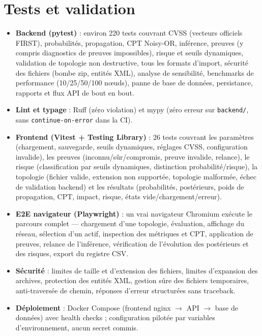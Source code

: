 \documentclass[12pt,a4paper]{article}
\newcommand{\forcereset}[1]{%
    \needspace{#1\baselineskip}%
}
\begin{document}
\newpage

\section{Tests et validation}
\forcereset{6}

\begin{itemize}[leftmargin=1.2cm, itemsep=0.2\baselineskip]
    \item \textbf{Backend (pytest)} : environ 220 tests couvrant CVSS (vecteurs officiels FIRST), probabilités, propagation, CPT Noisy-OR, inférence, preuves (y compris diagnostics de preuves impossibles), risque et seuils dynamiques, validation de topologie non destructive, tous les formats d'import, sécurité des fichiers (bombe zip, entités XML), analyse de sensibilité, benchmarks de performance (10/25/50/100 nœuds), panne de base de données, persistance, rapports et flux API de bout en bout.
    \item \textbf{Lint et typage} : Ruff (zéro violation) et mypy (zéro erreur sur \texttt{backend/}, sans \texttt{continue-on-error} dans la CI).
    \item \textbf{Frontend (Vitest + Testing Library)} : 26 tests couvrant les paramètres (chargement, sauvegarde, seuils dynamiques, réglages CVSS, configuration invalide), les preuves (inconnu/sûr/compromis, preuve invalide, relance), le risque (classification par seuils dynamiques, distinction probabilité/risque), la topologie (fichier valide, extension non supportée, topologie malformée, échec de validation backend) et les résultats (probabilités, postérieurs, poids de propagation, CPT, impact, risque, états vide/chargement/erreur).
    \item \textbf{E2E navigateur (Playwright)} : un vrai navigateur Chromium exécute le parcours complet — chargement d'une topologie, évaluation, affichage du réseau, sélection d'un actif, inspection des métriques et CPT, application de preuves, relance de l'inférence, vérification de l'évolution des postérieurs et des risques, export du registre CSV.
    \item \textbf{Sécurité} : limites de taille et d'extension des fichiers, limites d'expansion des archives, protection des entités XML, gestion sûre des fichiers temporaires, anti-traversée de chemin, réponses d'erreur structurées sans traceback.
    \item \textbf{Déploiement} : Docker Compose (frontend nginx $\rightarrow$ API $\rightarrow$ base de données) avec health checks ; configuration pilotée par variables d'environnement, aucun secret commis.
\end{itemize}
\end{document}
